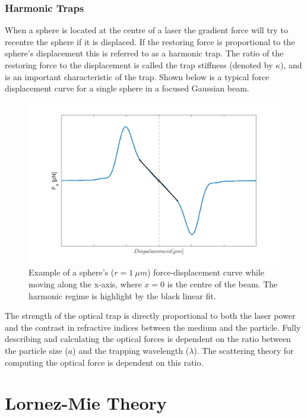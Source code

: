 \subsubsection{Harmonic Traps}
\label{sec:harmonic_traps}
When a sphere is located at the centre of a laser the gradient force
will try to recentre the sphere if it is displaced. If the restoring 
force is proportional to the sphere's displacement this is referred 
to as a harmonic trap. The ratio of the restoring force to the 
displacement is called the trap stiffness (denoted by $\kappa$), and 
is an important characteristic of the trap. Shown below is a typical 
force displacement curve for a single sphere in a focused Gaussian beam. 
\begin{figure}[h!]
	\centering
	\includegraphics[width=1.1\linewidth]{sphere_force_curve.png}
	\caption{Example of a sphere's ($r=1\ \mu m$) force-displacement curve 
			while moving along the x-axis, where $x=0$ is the centre of the
			beam. The harmonic regime is highlight by the black linear fit.}
	\label{fig:harmonic_trap}
\end{figure}

The strength of the optical trap is directly proportional to both 
the laser power and the contrast in refractive indices between the 
medium and the particle. Fully describing and calculating the 
optical forces is dependent on the ratio between the particle size 
($a$) and the trapping wavelength ($\lambda$). The scattering theory 
for computing the optical force is dependent on this ratio.  
\section{Lornez-Mie Theory}


